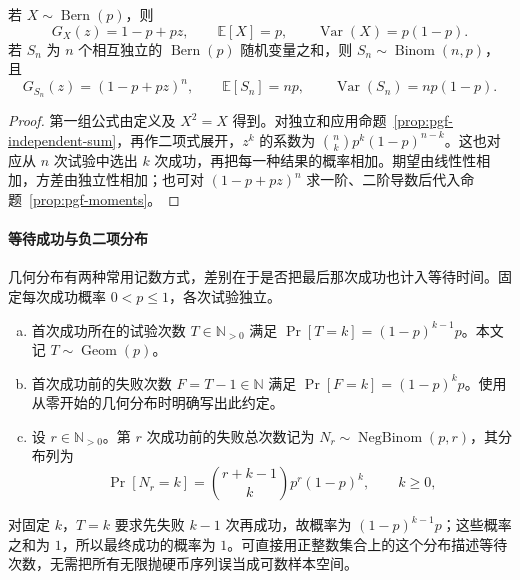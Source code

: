 \documentclass[lang=cn,a4paper,fontset=none,zihao=false,10pt,openany,twoside]{beautybook}
\numberwithin{algorithm}{chapter}
\newcommand{\N}{\mathbb N}
\begin{document}
\begin{proposition}\label{prop:binomial-pgf}
若 $X\sim\operatorname{Bern}(p)$，则
\[
 G_X(z)=1-p+pz,\qquad\mathbb E[X]=p,\qquad\operatorname{Var}(X)=p(1-p).
\]
若 $S_n$ 为 $n$ 个相互独立的 $\operatorname{Bern}(p)$ 随机变量之和，则 $S_n\sim\operatorname{Binom}(n,p)$，且
\[
 G_{S_n}(z)=(1-p+pz)^n,\qquad
 \mathbb E[S_n]=np,\qquad\operatorname{Var}(S_n)=np(1-p).
\]
\end{proposition}
\begin{proof}
第一组公式由定义及 $X^2=X$ 得到。对独立和应用命题~\ref{prop:pgf-independent-sum}，再作二项式展开，$z^k$ 的系数为 $\binom nkp^k(1-p)^{n-k}$。这也对应从 $n$ 次试验中选出 $k$ 次成功，再把每一种结果的概率相加。期望由线性性相加，方差由独立性相加；也可对 $(1-p+pz)^n$ 求一阶、二阶导数后代入命题~\ref{prop:pgf-moments}。
\end{proof}

\paragraph{等待成功与负二项分布}
几何分布有两种常用记数方式，差别在于是否把最后那次成功也计入等待时间。固定每次成功概率 $0<p\le1$，各次试验独立。
\begin{definition}[几何分布与负二项分布]\label{def:geometric-negative-binomial}
\begin{enumerate}[(a)]
\item 首次成功所在的试验次数 $T\in\N_{>0}$ 满足
$\Pr[T=k]=(1-p)^{k-1}p$。本文记 $T\sim\operatorname{Geom}(p)$。
\item 首次成功前的失败次数 $F=T-1\in\N$ 满足
$\Pr[F=k]=(1-p)^kp$。使用从零开始的几何分布时明确写出此约定。
\item 设 $r\in\N_{>0}$。第 $r$ 次成功前的失败总次数记为 $N_r\sim\operatorname{NegBinom}(p,r)$，其分布列为
\[
 \Pr[N_r=k]=\binom{r+k-1}{k}p^r(1-p)^k,\qquad k\ge0,
\]
\end{enumerate}
\end{definition}
对固定 $k$，$T=k$ 要求先失败 $k-1$ 次再成功，故概率为 $(1-p)^{k-1}p$；这些概率之和为 $1$，所以最终成功的概率为 $1$。可直接用正整数集合上的这个分布描述等待次数，无需把所有无限抛硬币序列误当成可数样本空间。
\end{document}
